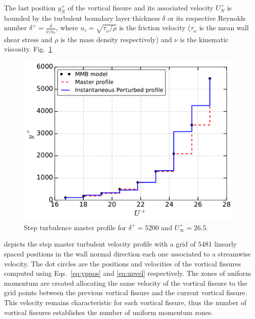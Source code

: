\documentclass[aps,reprint,amsmath,amssymb,pra]{revtex4-1}%
\begin{document}
The last position $y_{N}^+$ of the vortical fissure and its associated velocity $U^+_{N}$ is bounded by the turbulent boundary layer thickness $\delta$ or its respective Reynolds number $\delta^+=\frac{\delta}{\nu/u_{\tau}}$, where $u_{\tau}=\sqrt{\tau_{\omega}/\rho}$ is the friction velocity ($\tau_{\omega}$ is the mean wall shear stress and $\rho$ is the mass density respectively) and $\nu$ is the kinematic viscosity. 
Fig.~\ref{fig:master_profile} 
\begin{figure}[b]
\includegraphics[scale=0.46]{figures/Master_step_profile}
\caption{\label{fig:master_profile} Step turbulence master profile for $\delta^+=5200$ and $U^+_{\infty}=26.5$.}
\end{figure} 
depicts the step master turbulent velocity profile with a grid of $5481$ linearly spaced positions in the wall normal direction each one associated to a streamwise velocity. The dot circles are the positions and velocities of the vortical fissures computed using Eqs.~\ref{eq:yppos} and \ref{eq:upvel} respectively. The zones of uniform momentum are created allocating the same velocity of the vortical fissure to the grid points between the previous vortical fissure and the current vortical fissure. This velocity remains characteristic for each vortical fissure, thus the number of vortical fissures establishes the number of uniform momentum zones. \\
\end{document}

